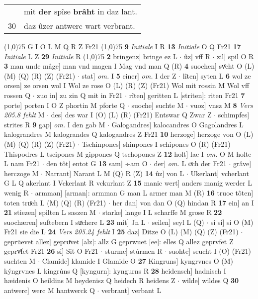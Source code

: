\documentclass[8pt,a4paper,notitlepage]{article}
\begin{document}
\begin{table}[ht]
\begin{minipage}[t]{0.5\linewidth}
\begin{tabular}{rl}
 & mit \textbf{der} spîse \textbf{brâht} in daz lant.\\ 
30 & daz ûzer antwerc wart verbrant.\\ 
\end{tabular}
\scriptsize
\line(1,0){75} \newline
G I O L M Q R Z Fr21 \newline
\line(1,0){75} \newline
\textbf{9} \textit{Initiale} I R  \textbf{13} \textit{Initiale} O Q Fr21  \textbf{17} \textit{Initiale} L Z  \textbf{29} \textit{Initiale} R  \newline
\line(1,0){75} \newline
\textbf{2} bringenz] bringe ez L  $\cdot$ ûz] vff R  $\cdot$ zil] spil O R \textbf{3} man unde mâge] man vnd magen I Mag vnd man Q (R) \textbf{4} suochen] svͦcht O (L) (M) (Q) (R) (Z) (Fr21)  $\cdot$ stat] \textit{om.} I \textbf{5} einer] \textit{om.} I der Z  $\cdot$ lîten] syten L \textbf{6} wol ze orsen] ze orsen wol I Wol ze rose O (L) (R) (Z) (Fr21) Wol mit rossin M Wol vff rossen Q  $\cdot$ zuo in] zu zin Q mit in Fr21  $\cdot$ rîten] geritten L [striten]: riten Fr21 \textbf{7} porte] porten I O Z phortin M pforte Q  $\cdot$ suoche] suchte M  $\cdot$ vuoz] vnsz M \textbf{8} \textit{Vers 205.8 fehlt} M   $\cdot$ des] des war I (O) (L) (R) (Fr21) Entswar Q Zwar Z  $\cdot$ schimpfes] strites R \textbf{9} gap] \textit{om.} I den gab M  $\cdot$ Galogandres] kalocandres O Gagolandres L kalograndres M kalograndes Q kalogandres Z Fr21 \textbf{10} herzoge] herzoge von O (L) (M) (Q) (R) (Z) (Fr21)  $\cdot$ Tschinpones] shinpones I schipones O (R) (Fr21) Thispodres L tscipones M gippones Q tschopones Z \textbf{12} holt] lac I \textit{om.} O M holte L nam Fr21  $\cdot$ den tôt] entot G \textbf{13} sam] ÷am O  $\cdot$ der] \textit{om.} L oͮch der Fr21  $\cdot$ grâve] herczoge M  $\cdot$ Narrant] Narant L M (Q) R (Z) \textbf{14} ûz] von L  $\cdot$ Ukerlant] vcherlant G L Q akerlant I Vckerlant R vckurlant Z \textbf{15} manic wert] anders manig werder L wenig R  $\cdot$ armman] [arman]: armman G man L armer man M (R) \textbf{16} truoc tôten] toten truͯch L (M) (Q) (R) (Fr21)  $\cdot$ her dan] von dan O (Q) hindan R \textbf{17} ein] an I \textbf{21} stiezen] spilten L saszen M  $\cdot$ starke] lange I L scharffe M grose R \textbf{22} suochæren] suftebern I suͯchere L \textbf{23} mit] Jn L  $\cdot$ seilen] seyl L (Q)  $\cdot$ si si] si O (M) Fr21 sie die L \textbf{24} \textit{Vers 205.24 fehlt} I  \textbf{25} daz] Ditze O (L) (M) (Q) (Z) (Fr21)  $\cdot$ geprüevet allez] geproͮvet [alz]: allz G geprwuet [ee]: elles Q allez geprvfet Z geprvͦfet Fr21 \textbf{26} si] Sit O Fr21  $\cdot$ sturme] stúrmen R  $\cdot$ suohte] seucht I (O) (Fr21) suchten M  $\cdot$ Clamide] klamide I Glamide O \textbf{27} Kingruns] kyngrvnes O (M) kýngrvnes L kingrúns Q [kyngurn]: kyngurns R \textbf{28} heidensch] hadnisch I hæidenis O heildins M heydenisz Q heidech R heidens Z  $\cdot$ wilde] wildes Q \textbf{30} antwerc] werc M hantwerck Q  $\cdot$ verbrant] verbant L \newline

\end{minipage}
\end{table}
\end{document}

